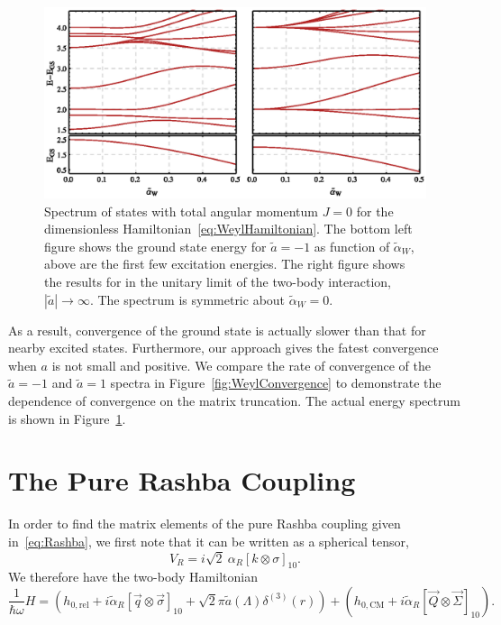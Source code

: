 \documentclass[%
 onecolumn,
 notitlepage,
 amsmath,amssymb,
 aps,
]{revtex4-1}
\begin{document}
\begin{figure}
\includegraphics{Figures/WeylSpectrum}\caption{\label{fig:WeylSpectrum} Spectrum of states with total angular momentum $J=0$ for the dimensionless Hamiltonian~\eqref{eq:WeylHamiltonian}. The bottom left figure shows the ground state energy for $\tilde{a}=-1$ as function of $\tilde{\alpha}_W$, above are the first few excitation energies. The right figure shows the results for in the unitary limit of the two-body interaction, $|\tilde{a}|\rightarrow\infty$. The spectrum is symmetric about $\tilde{\alpha}_W=0$.} 
\end{figure}


As a result, convergence of the ground state is actually slower than that for nearby excited states. Furthermore, our approach gives the fatest convergence when $a$ is not small and positive. We compare the rate of convergence of the $\tilde{a}=-1$ and $\tilde{a}=1$ spectra in Figure~\ref{fig:WeylConvergence} to demonstrate the dependence of convergence on the matrix truncation. The actual energy spectrum is shown in Figure~\ref{fig:WeylSpectrum}. 

\section{\label{sec:Rashba}The Pure Rashba Coupling}

In order to find the matrix elements of the pure Rashba coupling given in~\eqref{eq:Rashba}, we first note that it can be written as a spherical tensor,
\begin{equation}
V_{R}=i\sqrt{2}\:\alpha_R \left[ k \otimes \sigma \right]_{10}.
\end{equation}
We therefore have the two-body Hamiltonian
\begin{equation}\label{eq:RashbaHamiltonian}
\frac{1}{\hbar\omega}H=\left(h_{0,\text{rel}}+i \tilde{\alpha}_R  \left[ \vec{q} \otimes \vec{\sigma} \right]_{10} + \sqrt{2}\pi \tilde{a}(\Lambda) \delta^{(3)}(r)\right)+\left(h_{0,\text{CM}}+i \tilde{\alpha}_R [ \vec{Q}\otimes \vec{\Sigma} ]_{10} \right).
\end{equation}
\end{document}
